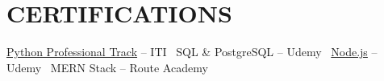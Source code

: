 \section*{CERTIFICATIONS}
{\small \href{https://drive.google.com/file/d/14rUrNXT_h6Fc6DbY-yI3sN91M9xL7rwQ/view?usp=sharing}{Python Professional Track} -- ITI \textbar\ SQL \& PostgreSQL -- Udemy \textbar\ \href{https://udemy-certificate.s3.amazonaws.com/image/UC-1915f7c1-c6fd-4351-8bf8-b6525184ef80.jpg?v=1782043676000}{Node.js} -- Udemy \textbar\ MERN Stack -- Route Academy}
